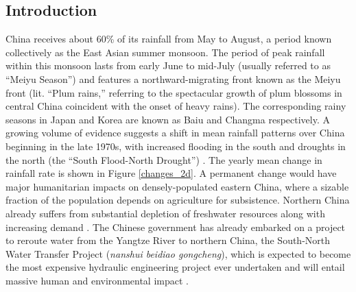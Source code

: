 \documentclass[draft,grl]{AGUTeX}
\begin{document}


\begin{article}

\section{Introduction}
 
 	China receives about 60\% of its rainfall from May to August, a period known collectively as the East Asian summer monsoon. The period of peak rainfall within this monsoon lasts from early June to mid-July (usually referred to as ``Meiyu Season'') and features a northward-migrating front known as the Meiyu front (lit. ``Plum rains,'' referring to the spectacular growth of plum blossoms in central China coincident with the onset of heavy rains). The corresponding rainy seasons in Japan and Korea are known as Baiu and Changma respectively. A growing volume of evidence suggests a shift in mean rainfall patterns over China beginning in the late 1970s, with increased flooding in the south and droughts in the north (the ``South Flood-North Drought'') \citep{Hu1997,Gong2002,Nigam2013}. The yearly mean change in rainfall rate is shown in Figure \ref{changes_2d}. A permanent change would have major humanitarian impacts on densely-populated eastern China, where a sizable fraction of the population depends on agriculture for subsistence. Northern China already suffers from substantial depletion of freshwater resources along with increasing demand \citep{Currell2012,Gleeson2012}. The Chinese government has already embarked on a project to reroute water from the Yangtze River to northern China, the South-North Water Transfer Project (\textit{nanshui beidiao gongcheng}), which is expected to become the most expensive hydraulic engineering project ever undertaken and will entail massive human and environmental impact \citep{Magee2011}.
 

\end{article}
\end{document}
